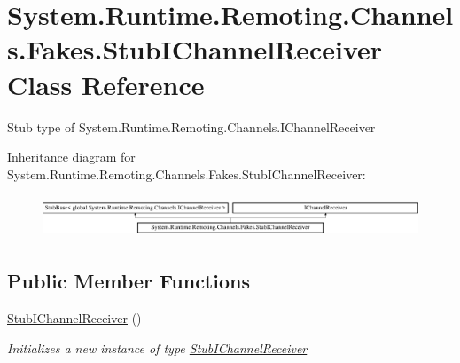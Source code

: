 \hypertarget{class_system_1_1_runtime_1_1_remoting_1_1_channels_1_1_fakes_1_1_stub_i_channel_receiver}{\section{System.\-Runtime.\-Remoting.\-Channels.\-Fakes.\-Stub\-I\-Channel\-Receiver Class Reference}
\label{class_system_1_1_runtime_1_1_remoting_1_1_channels_1_1_fakes_1_1_stub_i_channel_receiver}
}


Stub type of System.\-Runtime.\-Remoting.\-Channels.\-I\-Channel\-Receiver 


Inheritance diagram for System.\-Runtime.\-Remoting.\-Channels.\-Fakes.\-Stub\-I\-Channel\-Receiver\-:\begin{figure}[H]
\begin{center}
\leavevmode
\includegraphics[height=1.272727cm]{class_system_1_1_runtime_1_1_remoting_1_1_channels_1_1_fakes_1_1_stub_i_channel_receiver}
\end{center}
\end{figure}
\subsection*{Public Member Functions}
\begin{DoxyCompactItemize}
\item 
\hyperlink{class_system_1_1_runtime_1_1_remoting_1_1_channels_1_1_fakes_1_1_stub_i_channel_receiver_afbbc2c574db003357a6ec1bfc8ebc30a}{Stub\-I\-Channel\-Receiver} ()
\begin{DoxyCompactList}\small\item\em Initializes a new instance of type \hyperlink{class_system_1_1_runtime_1_1_remoting_1_1_channels_1_1_fakes_1_1_stub_i_channel_receiver}{Stub\-I\-Channel\-Receiver}\end{DoxyCompactList}\end{DoxyCompactItemize}
